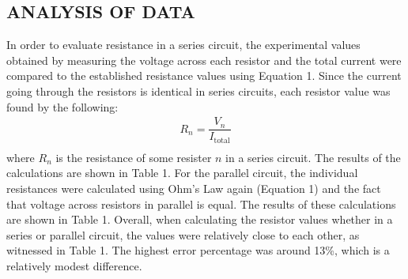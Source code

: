 \documentclass [12pt, letterpaper, twoside] {article}
\begin{document}
\subsection* {ANALYSIS OF DATA}
In order to evaluate resistance in a series circuit, the experimental values obtained by measuring the voltage across each resistor and the total current were compared to the established resistance values using Equation 1. Since the current going through the resistors is identical in series circuits, each resistor value was found by the following:
\begin{equation*}
  \begin{split}
    R_{n} = \dfrac{V_{n}}{I_{\text{total}}} \\
  \end{split}
\end{equation*}
where \(R_{n}\) is the resistance of some resister \(n\) in a series circuit. The results of the calculations are shown in Table 1. For the parallel circuit, the individual resistances were calculated using Ohm's Law again (Equation 1) and the fact that voltage across resistors in parallel is equal. The results of these calculations are shown in Table 1. Overall, when calculating the resistor values whether in a series or parallel circuit, the values were relatively close to each other, as witnessed in Table 1. The highest error percentage was around 13\%, which is a relatively modest difference. %
\end{document}
